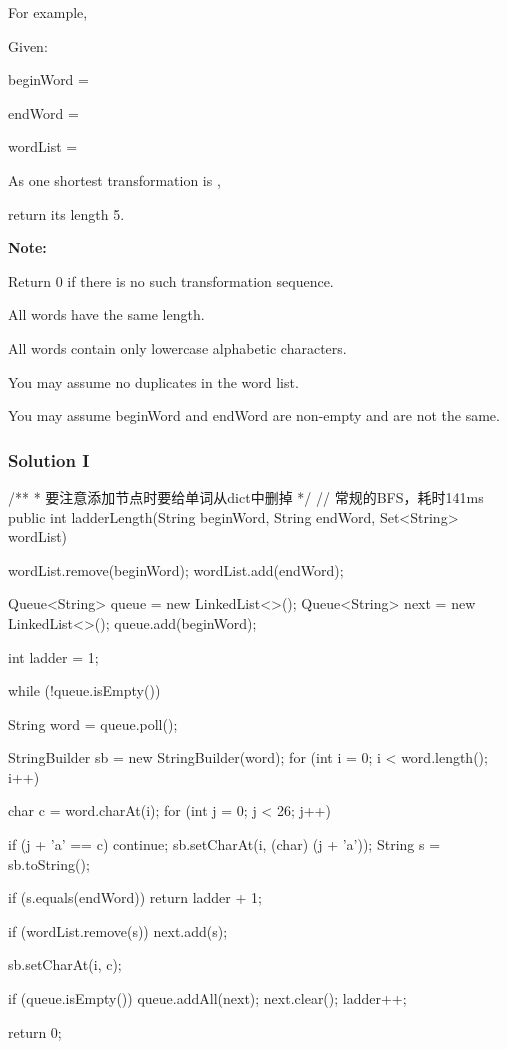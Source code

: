 For example,

Given:

beginWord = 

endWord = 

wordList = 

As one shortest transformation is ,

return its length 5.

\textbf{Note:}

Return 0 if there is no such transformation sequence.

All words have the same length.

All words contain only lowercase alphabetic characters.

You may assume no duplicates in the word list.

You may assume beginWord and endWord are non-empty and are not the same.

\newpage

\subsubsection{Solution I}

\begin{Code}
/**
 * 要注意添加节点时要给单词从dict中删掉
 */
// 常规的BFS，耗时141ms
public int ladderLength(String beginWord, String endWord, Set<String> wordList) {
    wordList.remove(beginWord);
    wordList.add(endWord);

    Queue<String> queue = new LinkedList<>();
    Queue<String> next = new LinkedList<>();
    queue.add(beginWord);

    int ladder = 1;

    while (!queue.isEmpty()) {
        String word = queue.poll();

        StringBuilder sb = new StringBuilder(word);
        for (int i = 0; i < word.length(); i++) {
            char c = word.charAt(i);
            for (int j = 0; j < 26; j++) {
                if (j + 'a' == c) {
                    continue;
                }
                sb.setCharAt(i, (char) (j + 'a'));
                String s = sb.toString();

                if (s.equals(endWord)) {
                    return ladder + 1;
                }

                if (wordList.remove(s)) {
                    next.add(s);
                }
            }
            sb.setCharAt(i, c);
        }

        if (queue.isEmpty()) {
            queue.addAll(next);
            next.clear();
            ladder++;
        }
    }

    return 0;
}
\end{Code}

